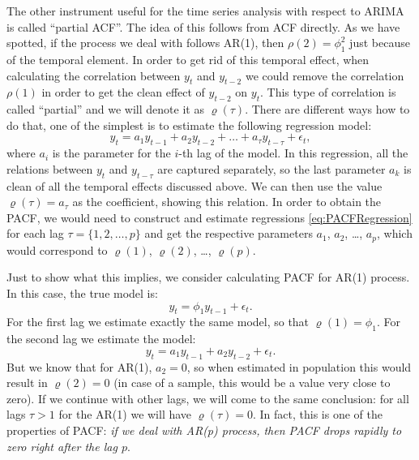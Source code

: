 \documentclass[
]{book}
\theoremstyle{definition}
\theoremstyle{definition}
\theoremstyle{definition}
\theoremstyle{definition}
\theoremstyle{remark}
\begin{document}
The other instrument useful for the time series analysis with respect to ARIMA is called ``partial ACF''. The idea of this follows from ACF directly. As we have spotted, if the process we deal with follows AR(1), then \(\rho(2)=\phi_1^2\) just because of the temporal element. In order to get rid of this temporal effect, when calculating the correlation between \(y_t\) and \(y_{t-2}\) we could remove the correlation \(\rho(1)\) in order to get the clean effect of \(y_{t-2}\) on \(y_t\). This type of correlation is called ``partial'' and we will denote it as \(\varrho(\tau)\). There are different ways how to do that, one of the simplest is to estimate the following regression model:
\begin{equation}
  y_t = a_1 y_{t-1} + a_2 y_{t-2} + \dots + a_\tau y_{t-\tau} + \epsilon_t,
  \label{eq:PACFRegression}
\end{equation}
where \(a_i\) is the parameter for the \(i\)-th lag of the model. In this regression, all the relations between \(y_t\) and \(y_{t-\tau}\) are captured separately, so the last parameter \(a_k\) is clean of all the temporal effects discussed above. We can then use the value \(\varrho(\tau) = a_\tau\) as the coefficient, showing this relation. In order to obtain the PACF, we would need to construct and estimate regressions \eqref{eq:PACFRegression} for each lag \(\tau=\{1, 2, \dots, p\}\) and get the respective parameters \(a_1\), \(a_2\), \ldots, \(a_p\), which would correspond to \(\varrho(1)\), \(\varrho(2)\), \ldots, \(\varrho(p)\).

Just to show what this implies, we consider calculating PACF for AR(1) process. In this case, the true model is:
\begin{equation*}
  y_t = \phi_1 y_{t-1} + \epsilon_t.
\end{equation*}
For the first lag we estimate exactly the same model, so that \(\varrho(1)=\phi_1\). For the second lag we estimate the model:
\begin{equation*}
  y_t = a_1 y_{t-1} + a_2 y_{t-2} + \epsilon_t.
\end{equation*}
But we know that for AR(1), \(a_2=0\), so when estimated in population this would result in \(\varrho(2)=0\) (in case of a sample, this would be a value very close to zero). If we continue with other lags, we will come to the same conclusion: for all lags \(\tau>1\) for the AR(1) we will have \(\varrho(\tau)=0\). In fact, this is one of the properties of PACF: \emph{if we deal with AR(p) process, then PACF drops rapidly to zero right after the lag \(p\)}.
\end{document}
